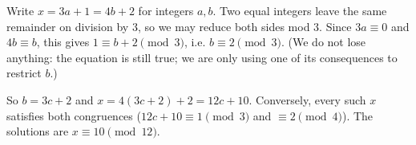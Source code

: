 Write $x=3a+1=4b+2$ for integers $a,b$. Two equal integers leave the same remainder on division by $3$, so we may reduce both sides mod $3$. Since $3a\equiv0$ and $4b\equiv b$, this gives $1\equiv b+2\pmod3$, i.e. $b\equiv2\pmod3$. (We do not lose anything: the equation is still true; we are only using one of its consequences to restrict $b$.)

So $b=3c+2$ and $x=4(3c+2)+2=12c+10$. Conversely, every such $x$ satisfies both congruences ($12c+10\equiv1\pmod3$ and $\equiv2\pmod4$). The solutions are $\boxed{x\equiv10\pmod{12}}$.
